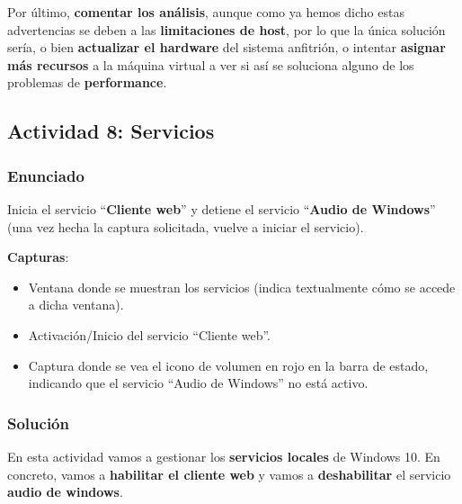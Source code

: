 Por último, \textbf{comentar los análisis}, aunque como ya hemos dicho estas advertencias se deben a las \textbf{limitaciones de host}, por lo que la única solución sería, o bien \textbf{actualizar el hardware} del sistema anfitrión, o intentar \textbf{asignar más recursos} a la máquina virtual a ver si así se soluciona alguno de los problemas de \textbf{performance}.

\subsection{Actividad 8: Servicios}
\subsubsection{Enunciado}
Inicia el servicio ``\textbf{Cliente web}'' y detiene el servicio ``\textbf{Audio de Windows}'' (una vez hecha la captura solicitada, vuelve a iniciar el servicio).

\textbf{Capturas}:
\begin{itemize}
    \item Ventana donde se muestran los servicios (indica textualmente cómo se accede a dicha ventana).
    \item Activación/Inicio del servicio ``Cliente web''.
    \item Captura donde se vea el icono de volumen en rojo en la barra de estado, indicando que el servicio ``Audio de Windows'' no está activo.
\end{itemize}

\subsubsection{Solución}
En esta actividad vamos a gestionar los \textbf{servicios locales} de Windows 10. En concreto, vamos a \textbf{habilitar el cliente web} y vamos a \textbf{deshabilitar} el servicio \textbf{audio de windows}.


